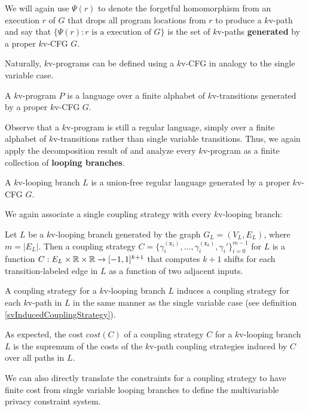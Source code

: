 We will again use $\Psi(r)$ to denote the forgetful homomorphism from an execution $r$ of $G$ that drops all program locations from $r$ to produce a $k$v-path and say that $\{\Psi(r): r\text{ is a execution of }G\}$ is the set of $k$v-paths \textbf{generated} by a proper $k$v-CFG $G$. 

Naturally, $k$v-programs can be defined using a $k$v-CFG in analogy to the single variable case. 

\begin{defn}
    A $k$v-program $P$ is a language over a finite alphabet of $k$v-transitions generated by a proper $k$v-CFG $G$. 
\end{defn}

Observe that a $k$v-program is still a regular language, simply over a finite alphabet of $k$v-transitions rather than single variable transitions. Thus, we again apply the decomposition result of \cite{afoninMinimalUnionFreeDecompositions2009} and analyze every $k$v-program as a finite collection of \textbf{looping branches}.

\begin{defn}
    A $k$v-looping branch $L$ is a union-free regular language generated by a proper $k$v-CFG $G$. 
\end{defn}

We again associate a single coupling strategy with every $k$v-looping branch:

\begin{defn}
    Let $L$ be a $k$v-looping branch generated by the graph $G_L = (V_L, E_L)$, where $m = |E_L|$. Then a coupling strategy $C = \{\gamma_i^{(\texttt{x}_1)},\ldots, \gamma_i^{(\texttt{x}_k)}, \gamma_i'\}_{i=0}^{m-1}$ for $L$ is a function $C:E_L\times\mathbb{R} \times\mathbb{R}\to [-1, 1]^{k+1}$ that computes $k+1$ shifts for each transition-labeled edge in $L$ as a function of two adjacent inputs.
\end{defn}

A coupling strategy for a $k$v-looping branch $L$ induces a coupling strategy for each $k$v-path in $L$ in the same manner as the single variable case (see definition \ref{svInducedCouplingStrategy}). 

As expected, the cost $cost(C)$ of a coupling strategy $C$ for a $k$v-looping branch $L$ is the supremum of the costs of the $k$v-path coupling strategies induced by $C$ over all paths in $L$.

We can also directly translate the constraints for a coupling strategy to have finite cost from single variable looping branches to define the multivariable privacy constraint system.

